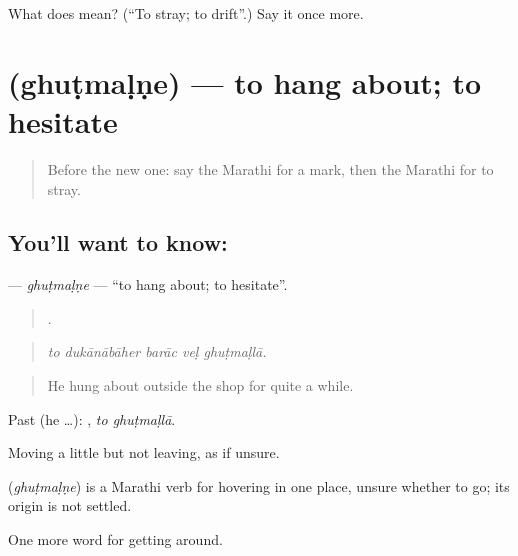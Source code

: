 \begin{tcolorbox}[breakable,colback=teal!4,colframe=teal!35!black,title={Before you move on}]
What does  mean? (\textquotedblleft{}To stray; to drift\textquotedblright{}.) Say it once more.
\end{tcolorbox}
\section[\texorpdfstring{\mr{घुटमळणे} (ghuṭmaḷṇe)}{घुटमळणे (ghuṭmaḷṇe)}]{ (ghuṭmaḷṇe) — to hang about; to hesitate}

\label{lesson:MR-C412-ghutmalne}



\begin{quote}
Before the new one: say the Marathi for a mark, then the Marathi for to stray.
\end{quote}

\subsection*{You'll want to know: }
\textbf{} — \emph{ghuṭmaḷṇe} — \textquotedblleft{}to hang about; to hesitate\textquotedblright{}.

\begin{quote}
    .
\end{quote}

\begin{quote}
\emph{to dukānābāher barāc veḷ ghuṭmaḷlā.}
\end{quote}

\begin{quote}
He hung about outside the shop for quite a while.
\end{quote}

Past (he …):  , \emph{to ghuṭmaḷlā}.

Moving a little but not leaving, as if unsure.

\begin{cousinweb}
\textbf{} (\emph{ghuṭmaḷṇe}) is a Marathi verb for hovering in one place, unsure whether to go; its origin is not settled.
\end{cousinweb}

\begin{grammarlens}[title={What you've built}]
One more word for getting around.
\end{grammarlens}


